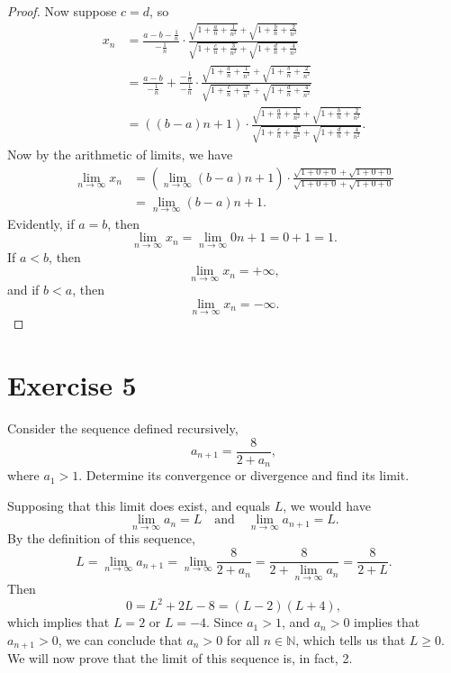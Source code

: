 \documentclass[12pt]{article}
\newenvironment{problem}
    {\begin{lrbox}{\mybox}\begin{minipage}{0.98\textwidth}}
    {\end{minipage}\end{lrbox}\framebox[\textwidth]{\usebox{\mybox}}}
\newcommand{\ds}{\displaystyle}
\newcommand{\isp}[1]{\quad\text{#1}\quad}
\newcommand{\N}{\mathbb{N}} %
\newcommand{\<}{\left\langle} %
\renewcommand{\>}{\right\rangle} %
\begin{document}
\begin{proof}
    Now suppose $c=d$, so
    \begin{align*}
        x_n 
            &= \frac{a-b -\frac1n}{-\frac1n} \cdot  \frac{\sqrt{1+\frac{a}n+\frac1{n^2}}+\sqrt{1+\frac{b}n+\frac2{n^2}}}{\sqrt{1+\frac{c}n+\frac3{n^2}}+\sqrt{1+\frac{d}n+\frac4{n^2}}} \\
            &= \frac{a-b}{-\frac1n} + \frac{-\frac1n}{-\frac1n} \cdot  \frac{\sqrt{1+\frac{a}n+\frac1{n^2}}+\sqrt{1+\frac{b}n+\frac2{n^2}}}{\sqrt{1+\frac{c}n+\frac3{n^2}}+\sqrt{1+\frac{d}n+\frac4{n^2}}} \\
            &= ((b-a)n + 1) \cdot  \frac{\sqrt{1+\frac{a}n+\frac1{n^2}}+\sqrt{1+\frac{b}n+\frac2{n^2}}}{\sqrt{1+\frac{c}n+\frac3{n^2}}+\sqrt{1+\frac{d}n+\frac4{n^2}}}.
    \end{align*}
    Now by the arithmetic of limits, we have
    \begin{align*}
        \lim_{n\to \infty}x_n
            &= (\lim_{n\to\infty}(b-a)n + 1) \cdot  \frac{\sqrt{1+0+0}+\sqrt{1+0+0}}{\sqrt{1+0+0}+\sqrt{1+0+0}} \\
            &= \lim_{n\to\infty}(b-a)n + 1.
    \end{align*}
    Evidently, if $a=b$, then
    \[\lim_{n\to \infty}x_n = \lim_{n\to\infty}0n + 1 = 0 + 1 = 1.\]
    If $a<b$, then
    \[\lim_{n\to \infty}x_n = +\infty,\]
    and if $b<a$, then
    \[\lim_{n\to \infty}x_n = -\infty.\]
    
\end{proof}

\newpage
\section*{Exercise 5}
\begin{problem}
    Consider the sequence defined recursively,
    \begin{equation}
        a_{n+1} = \frac{8}{2+a_n},
    \end{equation}
    where $a_1 > 1$. Determine its convergence or divergence and find its limit. 
\end{problem}
\medskip

Supposing that this limit does exist, and equals $L$, we would have
\[\lim_{n\to\infty} a_n = L \isp{and} \lim_{n\to\infty} a_{n+1} = L.\]
By the definition of this sequence,
\[L = \lim_{n\to\infty} a_{n+1} = \lim_{n\to\infty} \frac8{2+a_n} = \frac8{2 + \ds\lim_{n\to\infty} a_n} = \frac8{2+L}.\]
Then
\[0 = L^2 + 2L - 8 = (L-2)(L+4),\]
which implies that $L=2$ or $L=-4$. Since $a_1>1$, and $a_n>0$ implies that $a_{n+1}>0$, we can conclude that $a_n>0$ for all $n\in\N$, which tells us that $L\geq 0$. We will now prove that the limit of this sequence is, in fact, 2.
\end{document}
